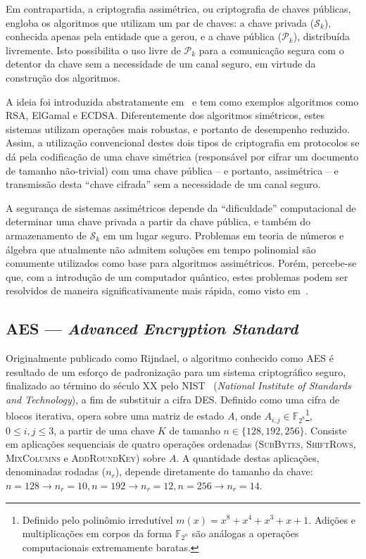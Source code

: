 \documentclass[12pt]{report}
\newcommand{\pk}{\mathcal{P}_k}
\newcommand{\sk}{\mathcal{S}_k}
\begin{document}
Em contrapartida, a criptografia assimétrica, ou criptografia de chaves
públicas, engloba os algoritmos que utilizam um par de chaves: a chave privada
($\sk{}$), conhecida apenas pela entidade que a gerou, e a chave pública
($\pk{}$), distribuída livremente. Isto possibilita o uso livre de $\pk{}$ para
a comunicação segura com o detentor da chave sem a necessidade de um canal
seguro, em virtude da construção dos algoritmos.

A ideia foi introduzida abstratamente em~\cite{Diffie:2006:NDC:2263321.2269104}
e tem como exemplos algoritmos como RSA, ElGamal e ECDSA.
Diferentemente dos algoritmos simétricos, estes sistemas utilizam operações
mais robustas, e portanto de desempenho reduzido. Assim, a utilização
convencional destes dois tipos de criptografia em protocolos se dá pela
codificação de uma chave simétrica (responsável por cifrar um documento
de tamanho não-trivial) com uma chave pública -- e portanto,
assimétrica -- e transmissão desta ``chave cifrada'' sem a necessidade de
um canal seguro.

A segurança de sistemas assimétricos depende da ``dificuldade''
computacional de determinar uma chave privada a partir da chave pública,
e também do armazenamento de $\sk{}$ em um lugar seguro. Problemas em
teoria de números e álgebra que atualmente não admitem soluções em tempo
polinomial são comumente utilizados como base para algoritmos assimétricos.
Porém, percebe-se que, com a introdução de um computador quântico, estes
problemas podem ser resolvidos de maneira significativamente mais rápida,
como visto em~\cite{Shor:1997:PAP:264393.264406}.

\subsection{AES --- \emph{Advanced Encryption Standard}}

Originalmente publicado como Rijndael, o algoritmo conhecido como AES é resultado
de um esforço de padronização para um sistema criptográfico seguro, finalizado
ao término do século XX pelo NIST~\cite{Standards2001} (\emph{National Institute
of Standards and Technology}), a fim de substituir a cifra DES.
Definido como uma cifra de blocos iterativa, opera
sobre uma matriz de estado $A$, onde $A_{i,j} \in 
\mathbb{F}_{2^{8}}$\footnote{Definido pelo polinômio irredutível
$m(x) = x^{8} + x^{4} + x^{3} + x + 1$. Adições e multiplicações em corpos da
forma $\mathbb{F}_{2^n}$ são análogas a operações computacionais extremamente
baratas.}, $0 \leq i, j \leq 3$, a partir de uma chave $K$ de tamanho $n \in \{128, 192,
256\}$. Consiste em aplicações sequenciais de quatro operações ordenadas
(\textsc{SubBytes}, \textsc{ShiftRows}, \textsc{MixColumns} e
\textsc{AddRoundKey}) sobre $A$. A quantidade destas aplicações, denominadas
rodadas ($n_r$), depende diretamente do tamanho da chave: $n = 128 \rightarrow
n_r = 10, n = 192 \rightarrow n_r = 12, n = 256 \rightarrow n_r = 14$.
\end{document}
